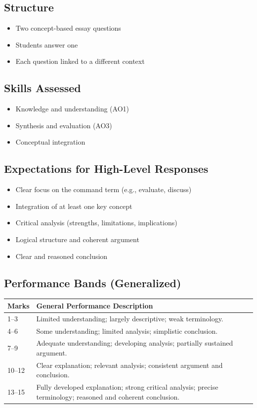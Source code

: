 \documentclass[12pt,a4paper]{article}
\begin{document}
\subsection*{Structure}
\begin{itemize}
    \item Two concept-based essay questions
    \item Students answer one
    \item Each question linked to a different context
\end{itemize}

\subsection*{Skills Assessed}
\begin{itemize}
    \item Knowledge and understanding (AO1)
    \item Synthesis and evaluation (AO3)
    \item Conceptual integration
\end{itemize}

\subsection*{Expectations for High-Level Responses}
\begin{itemize}
    \item Clear focus on the command term (e.g., evaluate, discuss)
    \item Integration of at least one key concept
    \item Critical analysis (strengths, limitations, implications)
    \item Logical structure and coherent argument
    \item Clear and reasoned conclusion
\end{itemize}

\subsection*{Performance Bands (Generalized)}

\begin{longtable}{p{1.5cm} p{12cm}}
\toprule
\textbf{Marks} & \textbf{General Performance Description} \\
\midrule
1--3 & Limited understanding; largely descriptive; weak terminology. \\
4--6 & Some understanding; limited analysis; simplistic conclusion. \\
7--9 & Adequate understanding; developing analysis; partially sustained argument. \\
10--12 & Clear explanation; relevant analysis; consistent argument and conclusion. \\
13--15 & Fully developed explanation; strong critical analysis; precise terminology; reasoned and coherent conclusion. \\
\bottomrule
\end{longtable}
\end{document}
